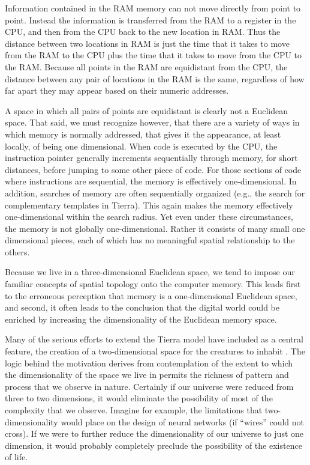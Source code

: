 Information contained in the RAM memory can not move directly from
point to point.  Instead the information is transferred from the RAM to
a register in the CPU, and then from the CPU back to the new location
in RAM.  Thus the distance between two locations in RAM is just the time
that it takes to move from the RAM to the CPU plus the time that it takes
to move from the CPU to the RAM.  Because all points in the RAM are
equidistant from the CPU, the distance between any pair of locations in
the RAM is the same, regardless of how far apart they may appear based
on their numeric addresses.

A space in which all pairs of points are equidistant is clearly not a
Euclidean space.  That said, we must recognize however, that there
are a variety of ways in which memory is normally addressed, that gives
it the appearance, at least locally, of being one dimensional.  When
code is executed by the CPU, the instruction pointer generally increments
sequentially through memory, for short distances, before jumping to
some other piece of code.  For those sections of code where instructions
are sequential, the memory is effectively one-dimensional.  In addition,
searches of memory are often sequentially organized (e.g., the search
for complementary templates in Tierra).  This again makes the memory
effectively one-dimensional within the search radius.  Yet even under
these circumstances, the memory is not globally one-dimensional.  Rather
it consists of many small one dimensional pieces, each of which
has no meaningful spatial relationship to the others.

Because we live in a three-dimensional Euclidean space, we tend to impose
our familiar concepts of spatial topology onto the computer memory.  This
leads first to the erroneous perception that memory is a one-dimensional
Euclidean space, and second, it often leads to the conclusion that the
digital world could be enriched by increasing the dimensionality of the
Euclidean memory space.

Many of the serious efforts to extend the Tierra model have included as
a central feature, the creation of a two-dimensional space for the
creatures to inhabit \cite{BaDa,Davi1,Davi2,Male,Skip}.
The logic behind the motivation derives from contemplation of the extent
to which the dimensionality of the space we live in permits the richness
of pattern and process that we observe in nature.  Certainly if our
universe were reduced from three to two dimensions, it would eliminate
the possibility of most of the complexity that we observe.  Imagine for
example, the limitations that two-dimensionality would place on the
design of neural networks (if ``wires'' could not cross).  If we were
to further reduce the dimensionality of our universe to just one
dimension, it would probably completely preclude the possibility of the
existence of life.

